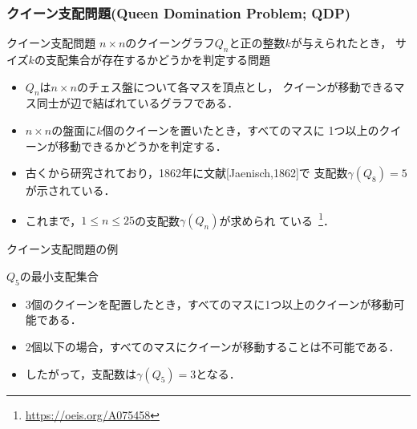 \documentclass[dvipdfmx,10pt]{beamer}
\begin{document}
%
%
\begin{frame}\frametitle{クイーン支配問題(Queen Domination Problem; QDP)}

  \begin{alertblock}{クイーン支配問題}\centering
    $n\times n$のクイーングラフ$Q_n$と正の整数$k$が与えられたとき，
    サイズ$k$の支配集合が存在するかどうかを判定する問題
 \end{alertblock}
 \vfill
 \begin{itemize}
 \item $Q_n$は$n\times n$のチェス盤について各マスを頂点とし，
   クイーンが移動できるマス同士が辺で結ばれているグラフである．
 \item $n\times n$の盤面に$k$個のクイーンを置いたとき，すべてのマスに
       1つ以上のクイーンが移動できるかどうかを判定する．
 \item 古くから研究されており，1862年に文献[Jaenisch,1862]で
   支配数$\gamma(Q_8)=5$が示されている．
 \item これまで，$1\leq n\leq 25$の支配数$\gamma(Q_n)$が求められ
   ている~\footnote{\url{https://oeis.org/A075458}}．
 \end{itemize}
\end{frame}
 
 
%
%

\begin{frame}{クイーン支配問題の例}
  \begin{exampleblock}{$Q_5$の最小支配集合}
  \begin{center}
   \scalebox{1.3}{
   
   }
  \end{center}
 \end{exampleblock}
 \vfill
 \begin{itemize}
  \item 3個のクイーンを配置したとき，すべてのマスに1つ以上のクイーンが移動可能である．
  \item 2個以下の場合，すべてのマスにクイーンが移動することは不可能である．
  \item したがって，支配数は$\gamma(Q_{5})=3$となる．
 \end{itemize}
\end{frame}



%
%
\end{document}
